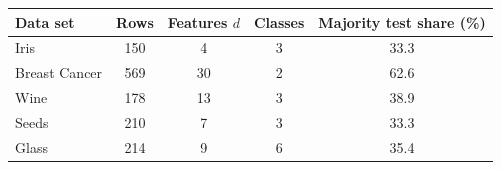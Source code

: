 \begin{tabular}{@{}lcccc@{}}
\toprule
Data set & Rows & Features $d$ & Classes & Majority test share (\%) \\
\midrule
Iris & 150 & 4 & 3 & 33.3 \\
Breast Cancer & 569 & 30 & 2 & 62.6 \\
Wine & 178 & 13 & 3 & 38.9 \\
Seeds & 210 & 7 & 3 & 33.3 \\
Glass & 214 & 9 & 6 & 35.4 \\
\bottomrule
\end{tabular}
